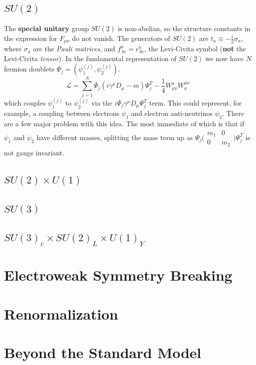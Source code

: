 \subsection{$SU(2)$}
The \textbf{special unitary} group $SU(2)$ is non-abelian, so the structure constants in the expression for $F_{\mu\nu}$ do not vanish.
The generators of $SU(2)$ are $t_a \equiv -\frac{i}{2}\sigma_a$, where $\sigma_a$ are the \textit{Pauli matrices}, and $f^a_{\ bc} = \epsilon^a_{\ bc}$, the Levi-Civita symbol (\textbf{not} the Levi-Civita \textit{tensor}).
In the fundamental representation of $SU(2)$ we now have $N$ fermion doublets $\Psi_j = \left( \psi_1^{(j)} , \psi_2^{(j)} \right)$.
\begin{equation}
    \mathcal{L} = \sum_{j=1}^{N} \bar{\Psi}_j \left( i\gamma^\mu D_\mu - m \right) \Psi_j^T - \frac{1}{4}W^a_{\mu\nu}W^{\mu\nu}_a
\end{equation}
which couples $\psi_1^{(j)}$ to $\psi_2^{(j)}$ via the $i \bar{\Psi}_j \gamma^\mu D_\mu \Psi_j^T$ term.
This could represent, for example, a coupling between electrons $\psi_1$ and electron anti-neutrinos $\psi_2$. 
There are a few major problem with this idea.
The most immediate of which is that if $\psi_1$ and $\psi_2$ have different masses,
splitting the mass term up as $\Psi_j \bigl(\begin{smallmatrix} m_1&0 \\ 0&m_2 \end{smallmatrix}\bigr) \Psi_j^T$ is not gauge invariant.

\subsection{$SU(2) \times U(1)$}
\subsection{$SU(3)$}
\subsection{$SU(3)_c \times SU(2)_L \times U(1)_Y$}
\section{Electroweak Symmetry Breaking}
\section{Renormalization}
\section{Beyond the Standard Model}

